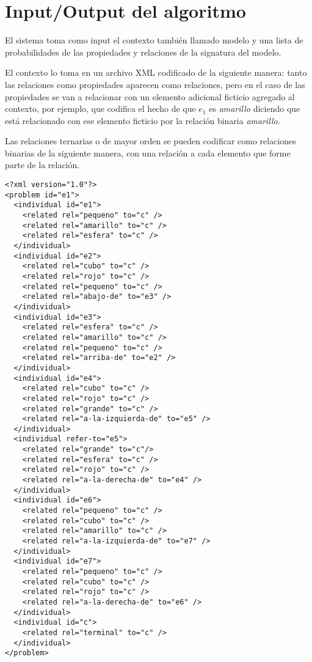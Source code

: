 \section{Input/Output del algoritmo}
\label{input_algo}
El sistema toma como input el contexto tambi\'en llamado modelo y una lista de probabilidades de las propiedades y relaciones de la signatura del modelo.

El contexto lo toma en un archivo XML codificado de la siguiente manera: tanto las relaciones como propiedades aparecen como relaciones, pero en el caso de las propiedades se van a relacionar con un elemento adicional ficticio agregado al contexto, por ejemplo, que codifica el hecho de que $e_1$ es \emph{amarillo} diciendo que est\'a relacionado con ese elemento ficticio por la relaci\'on binaria \emph{amarillo}. 

Las relaciones ternarias o de mayor orden se pueden codificar como relaciones binarias de la siguiente manera, con una relaci\'on a cada elemento que forme parte de la relaci\'on. 


\begin{verbatim}
<?xml version="1.0"?>
<problem id="e1">
  <individual id="e1">
    <related rel="pequeno" to="c" />
    <related rel="amarillo" to="c" />
    <related rel="esfera" to="c" />
  </individual>
  <individual id="e2">
    <related rel="cubo" to="c" />
    <related rel="rojo" to="c" />
    <related rel="pequeno" to="c" />
    <related rel="abajo-de" to="e3" />
  </individual>
  <individual id="e3">
    <related rel="esfera" to="c" />
    <related rel="amarillo" to="c" />
    <related rel="pequeno" to="c" />
    <related rel="arriba-de" to="e2" />
  </individual>
  <individual id="e4">
    <related rel="cubo" to="c" />
    <related rel="rojo" to="c" />
    <related rel="grande" to="c" />
    <related rel="a-la-izquierda-de" to="e5" />
  </individual>
  <individual refer-to="e5">
    <related rel="grande" to="c"/>
    <related rel="esfera" to="c" />
    <related rel="rojo" to="c" />
    <related rel="a-la-derecha-de" to="e4" />
  </individual>
  <individual id="e6">
    <related rel="pequeno" to="c" />
    <related rel="cubo" to="c" />
    <related rel="amarillo" to="c" />
    <related rel="a-la-izquierda-de" to="e7" />
  </individual>
  <individual id="e7">
    <related rel="pequeno" to="c" />
    <related rel="cubo" to="c" />
    <related rel="rojo" to="c" />
    <related rel="a-la-derecha-de" to="e6" />
  </individual>
  <individual id="c">
    <related rel="terminal" to="c" />
  </individual> 
</problem>
\end{verbatim}

